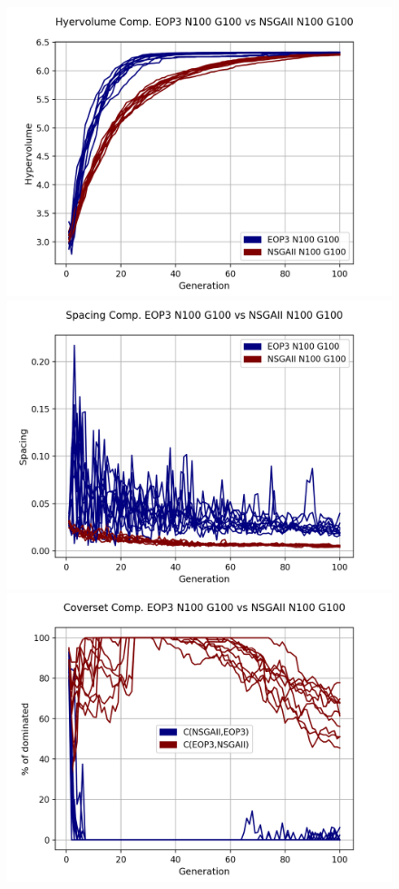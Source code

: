 \begin{figure}[H]
\includegraphics[scale=0.35]{../METRICS_PLOTS/Hypervol_COMP_EOP3N100G100_NSGAIIN100G100.png}
\includegraphics[scale=0.35]{../METRICS_PLOTS/Spacing_COMP_EOP3N100G100_NSGAIIN100G100.png}
\includegraphics[scale=0.35]{../METRICS_PLOTS/CoverSet_COMP_EOP3N100G100_NSGAIIN100G100.png}\\

\end{figure}
